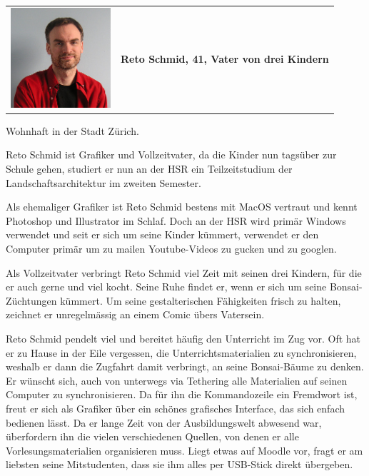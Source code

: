 \documentclass[a4paper]{article}
\begin{document}
\pagebreak
\begin{tabulary}{\linewidth}{m{10em}l}
	\includegraphics[width=10em]{../../img/userpersonaimages02.png} & \textbf{{\large Reto Schmid, 41, Vater von drei Kindern}} \\
\end{tabulary}

\begin{description}[uclist]
	\item[Adresse] Wohnhaft in der Stadt Zürich.
	\item[Ausbildung und Beruf] Reto Schmid ist Grafiker und Vollzeitvater, da die Kinder nun tagsüber zur Schule gehen, studiert er nun an der HSR ein Teilzeitstudium der Landschaftsarchitektur im zweiten Semester.
	\item[Informatikkenntnisse] Als ehemaliger Grafiker ist Reto Schmid bestens mit MacOS vertraut und kennt Photoshop und Illustrator im Schlaf. Doch an der HSR wird primär Windows verwendet und seit er sich um seine Kinder kümmert, verwendet er den Computer primär um zu mailen Youtube-Videos zu gucken und zu googlen.
	\item[Freizeitbeschäftigung] Als Vollzeitvater verbringt Reto Schmid viel Zeit mit seinen drei Kindern, für die er auch gerne und viel kocht. Seine Ruhe findet er, wenn er sich um seine Bonsai-Züchtungen kümmert. Um seine gestalterischen Fähigkeiten frisch zu halten, zeichnet er unregelmässig an einem Comic übers Vatersein.
	\item[Persönlichkeit] 
	\item[Einschränkungen, Ziele und Wünsche] Reto Schmid pendelt viel und bereitet häufig den Unterricht im Zug vor. Oft hat er zu Hause in der Eile vergessen, die Unterrichtsmaterialien zu synchronisieren, weshalb er dann die Zugfahrt damit verbringt, an seine Bonsai-Bäume zu denken. Er wünscht sich, auch von unterwegs via Tethering alle Materialien auf seinen Computer zu synchronisieren. Da für ihn die Kommandozeile ein Fremdwort ist, freut er sich als Grafiker über ein schönes grafisches Interface, das sich enfach bedienen lässt. Da er lange Zeit von der Ausbildungswelt abwesend war, überfordern ihn die vielen verschiedenen Quellen, von denen er alle Vorlesungsmaterialien organisieren muss. Liegt etwas auf Moodle vor, fragt er am liebsten seine Mitstudenten, dass sie ihm alles per USB-Stick direkt übergeben.

\end{description}
\end{document}
